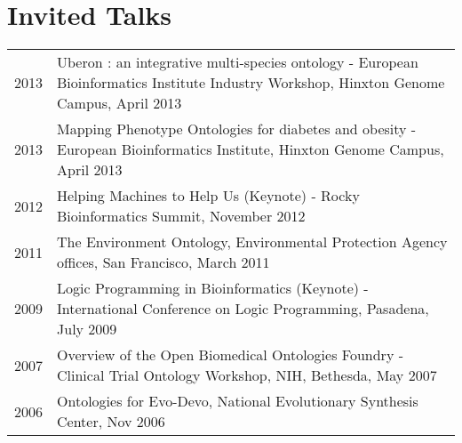 \documentclass[11pt,fullpage]{article}
\begin{document}

\section*{Invited Talks}

\begin{longtable}{p{0.5in}|p{5.5in}}


 2013 & Uberon : an integrative multi-species ontology - European Bioinformatics Institute Industry Workshop, 
 Hinxton Genome Campus, April 2013\\

 2013 & Mapping Phenotype Ontologies for diabetes and obesity - European Bioinformatics Institute, 
 Hinxton Genome Campus, April 2013\\

 2012 & Helping Machines to Help Us (Keynote) - Rocky Bioinformatics
 Summit, November 2012\\

 2011 & The Environment Ontology, Environmental Protection Agency offices, San Francisco, March 2011 \\

 2009 & Logic Programming in Bioinformatics (Keynote) - International
 Conference on Logic Programming, Pasadena, July 2009 \\

 2007 & Overview of the Open Biomedical Ontologies Foundry - Clinical Trial Ontology Workshop, NIH, Bethesda, May 2007 \\

 2006 & Ontologies for Evo-Devo, National Evolutionary Synthesis Center, Nov 2006 \\


\end{longtable}


\end{document}
